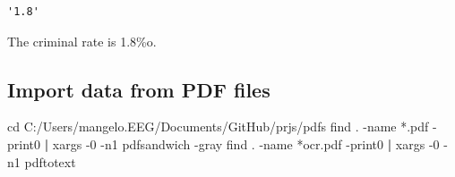 \documentclass[
  12pt,
]{article}
\newenvironment{Shaded}{\begin{snugshade}}{\end{snugshade}}
\newcommand{\AttributeTok}[1]{\textcolor[rgb]{0.77,0.63,0.00}{#1}}
\newcommand{\BuiltInTok}[1]{#1}
\newcommand{\FunctionTok}[1]{\textcolor[rgb]{0.00,0.00,0.00}{#1}}
\newcommand{\KeywordTok}[1]{\textcolor[rgb]{0.13,0.29,0.53}{\textbf{#1}}}
\newcommand{\NormalTok}[1]{#1}
\newcommand{\StringTok}[1]{\textcolor[rgb]{0.31,0.60,0.02}{#1}}
\begin{document}
\begin{verbatim}
'1.8'
\end{verbatim}

The criminal rate is 1.8\%o.

\vspace{0.3cm}

\hypertarget{import-data-from-pdf-files}{%
\subsection{Import data from PDF files}\label{import-data-from-pdf-files}}

\begin{Shaded}
\begin{Highlighting}[]
  \BuiltInTok{cd}\NormalTok{ C:/Users/mangelo.EEG/Documents/GitHub/prjs/pdfs}
    \FunctionTok{find}\NormalTok{ . }\AttributeTok{{-}name} \StringTok{\textquotesingle{}*.pdf\textquotesingle{}} \AttributeTok{{-}print0} \KeywordTok{|} \FunctionTok{xargs} \AttributeTok{{-}0} \AttributeTok{{-}n1}\NormalTok{ pdfsandwich }\AttributeTok{{-}gray}
    \FunctionTok{find}\NormalTok{ . }\AttributeTok{{-}name} \StringTok{\textquotesingle{}*ocr.pdf\textquotesingle{}} \AttributeTok{{-}print0} \KeywordTok{|} \FunctionTok{xargs} \AttributeTok{{-}0} \AttributeTok{{-}n1}\NormalTok{ pdftotext}
\end{Highlighting}
\end{Shaded}
\end{document}
